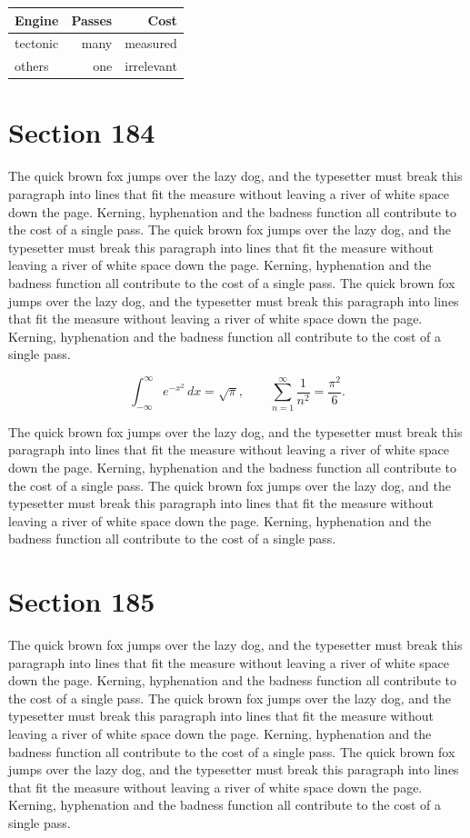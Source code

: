 \documentclass{article}
\begin{document}
\begin{center}
\begin{tabular}{lrr}
\toprule
Engine & Passes & Cost \\
\midrule
tectonic & many & measured \\
others & one & irrelevant \\
\bottomrule
\end{tabular}
\end{center}

\section{Section 184}
The quick brown fox jumps over the lazy dog, and the typesetter must break this paragraph into lines that fit the measure without leaving a river of white space down the page. Kerning, hyphenation and the badness function all contribute to the cost of a single pass. The quick brown fox jumps over the lazy dog, and the typesetter must break this paragraph into lines that fit the measure without leaving a river of white space down the page. Kerning, hyphenation and the badness function all contribute to the cost of a single pass. The quick brown fox jumps over the lazy dog, and the typesetter must break this paragraph into lines that fit the measure without leaving a river of white space down the page. Kerning, hyphenation and the badness function all contribute to the cost of a single pass. 

\begin{equation}
\int_{-\infty}^{\infty} e^{-x^{2}}\,dx = \sqrt{\pi}, \qquad
\sum_{n=1}^{\infty} \frac{1}{n^{2}} = \frac{\pi^{2}}{6}.
\end{equation}

The quick brown fox jumps over the lazy dog, and the typesetter must break this paragraph into lines that fit the measure without leaving a river of white space down the page. Kerning, hyphenation and the badness function all contribute to the cost of a single pass. The quick brown fox jumps over the lazy dog, and the typesetter must break this paragraph into lines that fit the measure without leaving a river of white space down the page. Kerning, hyphenation and the badness function all contribute to the cost of a single pass. 
\section{Section 185}
The quick brown fox jumps over the lazy dog, and the typesetter must break this paragraph into lines that fit the measure without leaving a river of white space down the page. Kerning, hyphenation and the badness function all contribute to the cost of a single pass. The quick brown fox jumps over the lazy dog, and the typesetter must break this paragraph into lines that fit the measure without leaving a river of white space down the page. Kerning, hyphenation and the badness function all contribute to the cost of a single pass. The quick brown fox jumps over the lazy dog, and the typesetter must break this paragraph into lines that fit the measure without leaving a river of white space down the page. Kerning, hyphenation and the badness function all contribute to the cost of a single pass. 
\end{document}
